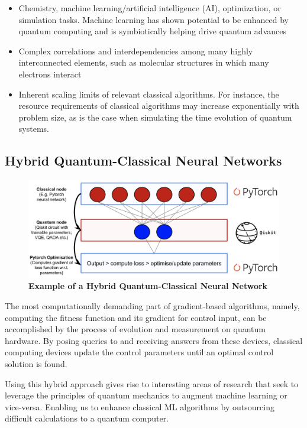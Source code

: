 \documentclass{scrartcl}
\begin{document}
\begin{itemize}
\item Chemistry, machine learning/artificial intelligence (AI), optimization, or simulation tasks. Machine learning has shown potential to be enhanced by quantum computing and is symbiotically helping drive quantum advances
\item Complex correlations and interdependencies among many highly interconnected elements, such as molecular structures in which many electrons interact
\item Inherent scaling limits of relevant classical algorithms. For instance, the resource requirements of classical algorithms may increase exponentially with problem size, as is the case when simulating the time evolution of quantum systems.
\end{itemize}

\subsection{Hybrid Quantum-Classical Neural Networks}
\label{sec:orgd332638}

\begin{figure}[htbp]
\centering
\includegraphics[width=.9\linewidth]{./assets/hybridnetwork.png}
\caption{\textbf{Example of a Hybrid Quantum-Classical Neural Network}}
\end{figure}

The most computationally demanding part of gradient-based algorithms, namely, computing the fitness function and its gradient for control input, can be accomplished by the process of evolution and measurement on quantum hardware. By posing queries to and receiving answers from these devices, classical computing devices update the control parameters until an optimal control solution is found.

Using this hybrid approach gives rise to interesting areas of research that seek to leverage the principles of quantum mechanics to augment machine learning or vice-versa. Enabling us to enhance classical ML algorithms by outsourcing difficult calculations to a quantum computer.
\end{document}
